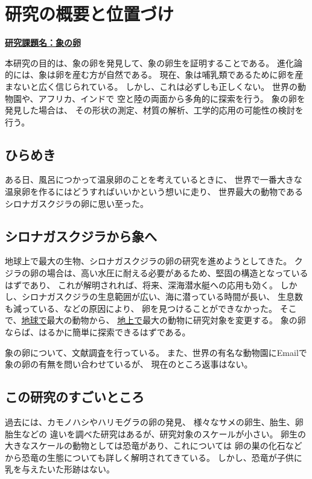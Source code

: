 \documentclass[11pt,a4j,dvipdfmx]{jarticle} 					%
\newcommand{\研究課題名}{象の卵}
\newcommand{\研究機関名}{逢坂大学}
\newcommand{\研究代表者氏名}{湯川秀樹}
\begin{document}

\section{研究の概要と位置づけ}

\noindent
\underline{\textbf{研究課題名：\研究課題名}}

本研究の目的は、象の卵を発見して、象の卵生を証明することである。
進化論的には、象は卵を産む方が自然である。
	現在、象は哺乳類であるために卵を産まないと広く信じられている。
	しかし、これは必ずしも正しくない。
	世界の動物園や、アフリカ、インドで
	空と陸の両面から多角的に探索を行う。
	象の卵を発見した場合は、
	その形状の測定、材質の解析、工学的応用の可能性の検討を行う。

\subsection{ひらめき}
ある日、風呂につかって温泉卵のことを考えているときに、
世界で一番大きな温泉卵を作るにはどうすればいいかという想いに走り、
世界最大の動物であるシロナガスクジラの卵に思い至った。

\subsection{シロナガスクジラから象へ}
\label{sec:whale}
地球上で最大の生物、シロナガスクジラの卵の研究を進めようとしてきた。
クジラの卵の場合は、高い水圧に耐える必要があるため、堅固の構造となっているはずであり、
これが解明されれば、将来、深海潜水艇への応用も効く。
しかし、シロナガスクジラの生息範囲が広い、海に潜っている時間が長い、
生息数も減っている、などの原因により、
卵を見つけることができなかった。
そこで、\underline{地球で}最大の動物から、
\underline{地上で}最大の動物に研究対象を変更する。
象の卵ならば、はるかに簡単に探索できるはずである。

	象の卵について、文献調査を行っている。
	また、世界の有名な動物園にEmailで象の卵の有無を問い合わせているが、
	現在のところ返事はない。

\subsection{この研究のすごいところ}
	過去には、カモノハシやハリモグラの卵の発見、
	様々なサメの卵生、胎生、卵胎生などの
	違いを調べた研究はあるが、研究対象のスケールが小さい。
	卵生の大きなスケールの動物としては恐竜があり、これについては
	卵の巣の化石などから恐竜の生態についても詳しく解明されてきている。
	しかし、恐竜が子供に乳を与えたいた形跡はない。
	
\end{document}
